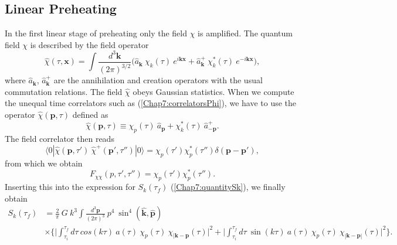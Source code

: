 \documentclass[11pt,a4paper,twoside]{book}
\begin{document}
\subsection{Linear Preheating}
In the first linear stage of preheating only the field $\chi$ is amplified. The quantum field $\chi$ is described by the field operator
\begin{equation}
\label{Chap7:QuantumFieldChi}
\hat{\chi}(\tau,\textbf{x}) = \int \frac{d^{3}\textbf{k}}{(2\pi)^{3/2}} \Big(\hat{a}_{\textbf{k}}\ \chi_{k}(\tau)\ e^{i\textbf{k}\textbf{x}} + \hat{a}_{\textbf{k}}^{+}\ \chi_{k}^{*}(\tau)\  e^{-i\textbf{k}\textbf{x}}\Big ),
\end{equation}
where $ \hat{a}_{\textbf{k}} $, $\hat{a}_{\textbf{k}}^{+}  $ are the annihilation and creation operators with the usual commutation relations. The field $\hat{\chi}$ obeys Gaussian statistics. When we  compute the unequal time correlators such as (\ref{Chap7:correlatorsPhi}), we have to use the operator $\hat{\chi}(\textbf{p},\tau)$ defined as
\begin{equation}
\label{Chap7:fieldChiOperator}
\hat{\chi}(\textbf{p},\tau)\equiv \chi_{p}(\tau)\ \hat{a}_{\textbf{p}} + \chi_{k}^{*}(\tau)\ \hat{a}_{-\textbf{p}}^{+}.
\end{equation}
The field correlator then reads
\begin{equation}
\label{Chap7:fieldCorrelator}
\langle 0|\hat{\chi}(\textbf{p},\tau')\ \hat{\chi}^{+}(\textbf{p}',\tau'')|0\rangle  = \chi_{p}(\tau ')\chi_{p}^{*}(\tau'')\delta(\textbf{p}-\textbf{p}'),
\end{equation}
from which we obtain
\begin{equation}
\label{Chap7:Fchichi}
F_{\chi\chi}(p,\tau',\tau '') = \chi_{p}(\tau')\chi_{p}^{*}(\tau'').
\end{equation}
Inserting this into the expression for $ S_{k}(\tau_{f}) $ (\ref{Chap7:quantitySk}),  we finally obtain
\begin{equation}
	\label{Chap7:quantitySk_preheating}
	\begin{split}
		S_{k}(\tau_{f}) & =\frac{2}{\pi}\ G\ k^{3}\int \frac{d^{3} \textbf{p}}{(2\pi)^{3}}\ p^{4}\ \sin^{4}(\hat{\textbf{k}},\hat{\textbf{p}}) \\
		& \times \Biggl\{\Bigg|\int_{\tau_{i}}^{\tau_{f}} d\tau\ cos(k\tau)\ a(\tau)\ \chi_{p}(\tau)\ \chi_{|\textbf{k}-\textbf{p}}(\tau)\Bigg|^{2} + \Bigg|\int_{\tau_{i}}^{\tau_{f}} d\tau\ \sin(k\tau)\ a(\tau)\ \chi_{p}(\tau)\ \chi_{|\textbf{k}-\textbf{p}|}(\tau) \Bigg|^{2}    \Biggr\}.  
	\end{split}
\end{equation}
\end{document}
